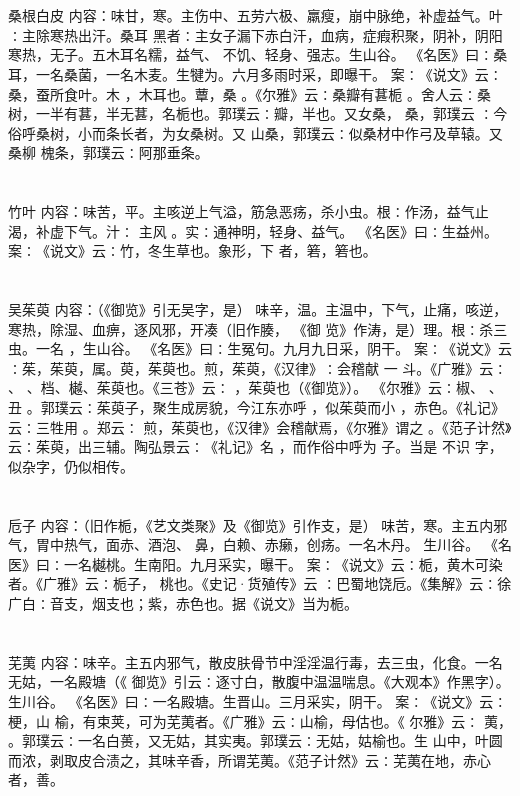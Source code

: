 \documentclass[12pt,UTF8]{ctexbook}
\begin{document}
\chapter{}桑根白皮
内容：味甘，寒。主伤中、五劳六极、羸瘦，崩中脉绝，补虚益气。叶∶主除寒热出汗。桑耳 
黑者∶主女子漏下赤白汗，血病，症瘕积聚，阴补，阴阳寒热，无子。五木耳名糯，益气、 
不饥、轻身、强志。生山谷。 
《名医》曰∶桑耳，一名桑菌，一名木麦。生犍为。六月多雨时采，即曝干。 
案∶《说文》云∶桑，蚕所食叶。木 ，木耳也。蕈，桑 。《尔雅》云∶桑瓣有葚栀 
。舍人云∶桑树，一半有葚，半无葚，名栀也。郭璞云∶瓣，半也。又女桑， 桑，郭璞云 
∶今俗呼桑树，小而条长者，为女桑树。又 山桑，郭璞云∶似桑材中作弓及草辕。又桑柳 
槐条，郭璞云∶阿那垂条。 


\chapter{}竹叶
内容：味苦，平。主咳逆上气溢，筋急恶疡，杀小虫。根∶作汤，益气止渴，补虚下气。汁∶ 
主风 。实∶通神明，轻身、益气。 
《名医》曰∶生益州。 
案∶《说文》云∶竹，冬生草也。象形，下 者，箬，箬也。 


\chapter{}吴茱萸
内容：（《御览》引无吴字，是） 
味辛，温。主温中，下气，止痛，咳逆，寒热，除湿、血痹，逐风邪，开凑（旧作腠， 
《御 
览》作涛，是）理。根∶杀三虫。一名 ，生山谷。 
《名医》曰∶生冤句。九月九日采，阴干。 
案∶《说文》云∶茱，茱萸，属。萸，茱萸也。煎，茱萸，《汉律》∶会稽献 一 
斗。《广雅》云∶ 、 、档、樾、茱萸也。《三苍》云∶ ，茱萸也（《御览》）。 
《尔雅》云∶椒、 、丑 。郭璞云∶茱萸子，聚生成房貌，今江东亦呼 ，似茱萸而小 
，赤色。《礼记》云∶三牲用 。郑云∶ 煎，茱萸也，《汉律》会稽献焉，《尔雅》谓之 
。《范子计然》云∶茱萸，出三辅。陶弘景云∶《礼记》名 ，而作俗中呼为 子。当是 
不识 字，似杂字，仍似相传。 


\chapter{}卮子
内容：（旧作栀，《艺文类聚》及《御览》引作支，是） 
味苦，寒。主五内邪气，胃中热气，面赤、酒泡、 鼻，白赖、赤癞，创疡。一名木丹。 
生川谷。 
《名医》曰∶一名樾桃。生南阳。九月采实，曝干。 
案∶《说文》云∶栀，黄木可染者。《广雅》云∶栀子， 桃也。《史记·货殖传》云 
∶巴蜀地饶卮。《集解》云∶徐广白∶音支，烟支也；紫，赤色也。据《说文》当为栀。 


\chapter{}芜荑
内容：味辛。主五内邪气，散皮肤骨节中淫淫温行毒，去三虫，化食。一名无姑，一名殿塘（《 
御览》引云∶逐寸白，散腹中温温喘息。《大观本》作黑字）。生川谷。 
《名医》曰∶一名殿塘。生晋山。三月采实，阴干。 
案∶《说文》云∶梗，山 榆，有束荚，可为芜荑者。《广雅》云∶山榆，母估也。《 
尔雅》云∶ 荑， 。郭璞云∶一名白蒉，又无姑，其实夷。郭璞云∶无姑，姑榆也。生 
山中，叶圆而浓，剥取皮合渍之，其味辛香，所谓芜荑。《范子计然》云∶芜荑在地，赤心 
者，善。 
\end{document}
